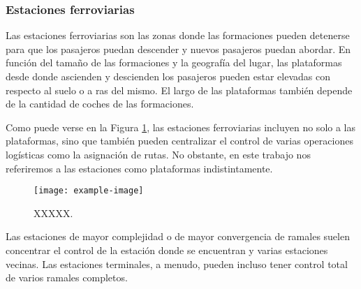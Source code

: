 \subsubsection{Estaciones ferroviarias}

Las estaciones ferroviarias son las zonas donde las formaciones pueden detenerse para que los pasajeros puedan descender y nuevos pasajeros puedan abordar. En función del tamaño de las formaciones y la geografía del lugar, las plataformas desde donde ascienden y descienden los pasajeros pueden estar elevadas con respecto al suelo o a ras del mismo. El largo de las plataformas también depende de la cantidad de coches de las formaciones.

Como puede verse en la Figura \ref{fig:estacion_1}, las estaciones ferroviarias incluyen no solo a las plataformas, sino que también pueden centralizar el control de varias operaciones logísticas como la asignación de rutas. No obstante, en este trabajo nos referiremos a las estaciones como plataformas indistintamente.

    \begin{figure}[!h]
        \centering
        \texttt{[image: example-image]}
        \centering\caption{XXXXX.}
        \label{fig:estacion_1}
    \end{figure}

Las estaciones de mayor complejidad o de mayor convergencia de ramales suelen concentrar el control de la estación donde se encuentran y varias estaciones vecinas. Las estaciones terminales, a menudo, pueden incluso tener control total de varios ramales completos.